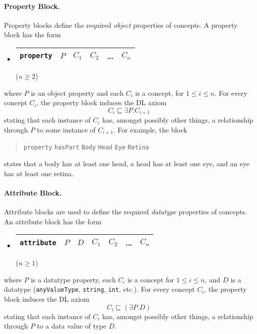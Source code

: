 \documentclass[11pt,onecolumn]{article}
\begin{document}
\paragraph{Property Block.} Property blocks define the required
\emph{object} properties of concepts. A property block has the form
\begin{itemize}
\item[]
  \begin{tabular}{|l|l|l|l|l|l|}\hline \texttt{property} & $P$ & $C_1$
& $C_2$ & \dots & $C_n$ \\ \hline
\end{tabular} \hfill ($n \ge 2$)
\end{itemize}
where $P$ is an object property and each $C_i$ is a concept, for $1
\le i \le n$.  For every concept $C_i$, the property block induces the
DL axiom \[C_i \sqsubseteq \exists P . C_{i+1} \] stating that each
instance of $C_i$ has, amongst possibly other things, a relationship
through $P$ to some instance of $C_{i+1}$.  For example, the block
\begin{quote}\texttt{property} \texttt{hasPart} \texttt{Body}
  \texttt{Head} \texttt{Eye} \texttt{Retina}
\end{quote} states that a body has at least one head, a head has at
least one eye, and an eye has at least one retina.

\paragraph{Attribute Block.} Attribute blocks are used to define the
required \emph{datatype} properties of concepts. An attribute block
has the form
\begin{itemize}
\item[]
  \begin{tabular}{|l|l|l|l|l|l|l|}\hline \texttt{attribute} & $P$ & $D$ & $C_1$
    & $C_2$ & \dots & $C_n$ \\ \hline
\end{tabular} \hfill ($n \ge 1$)
\end{itemize}
where $P$ is a datatype property, each $C_i$ is a concept for $1 \le i
\le n$, and $D$ is a datatype (\texttt{anyValueType}, \texttt{string},
\texttt{int}, etc.). For every concept $C_i$, the property block
induces the DL axiom \[C_i \sqsubseteq (\exists P . D)\] stating that
each instance of $C_i$ has, amongst possibly other things, a
relationship through $P$ to a data value of type $D$.
\end{document}
